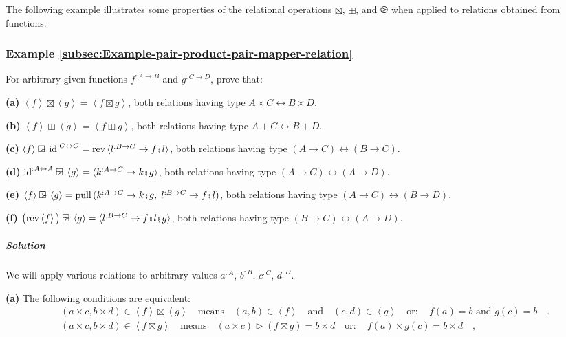 The following example illustrates some properties of the relational
operations $\boxtimes$, $\boxplus$, and $\ogreaterthan$ when applied
to relations obtained from functions.

\subsubsection{Example \label{subsec:Example-pair-product-pair-mapper-relation}\ref{subsec:Example-pair-product-pair-mapper-relation}}

For arbitrary given functions $f^{:A\rightarrow B}$ and $g^{:C\rightarrow D}$,
prove that:

\textbf{(a)} $\left<f\right>\boxtimes\left<g\right>=\left<f\boxtimes g\right>$,
both relations having type $A\times C\leftrightarrow B\times D$.

\textbf{(b)} $\left<f\right>\boxplus\left<g\right>=\left<f\boxplus g\right>$,
both relations having type $A+C\leftrightarrow B+D$.

\textbf{(c)} $\left<f\right>\ogreaterthan\text{id}^{:C\leftrightarrow C}=\text{rev}\,\langle l^{:B\rightarrow C}\rightarrow f\bef l\rangle$,
both relations having type $\left(A\rightarrow C\right)\leftrightarrow\left(B\rightarrow C\right)$.

\textbf{(d)} $\text{id}^{:A\leftrightarrow A}\ogreaterthan\left<g\right>=\langle k^{:A\rightarrow C}\rightarrow k\bef g\rangle$,
both relations having type $\left(A\rightarrow C\right)\leftrightarrow\left(A\rightarrow D\right)$.

\textbf{(e)} $\left<f\right>\ogreaterthan\left<g\right>=\text{pull}\,(k^{:A\rightarrow C}\rightarrow k\bef g,\;l^{:B\rightarrow C}\rightarrow f\bef l)$,
both relations having type $\left(A\rightarrow C\right)\leftrightarrow\left(B\rightarrow D\right)$.

\textbf{(f)} $\big(\text{rev}\left<f\right>\big)\ogreaterthan\left<g\right>=\langle l^{:B\rightarrow C}\rightarrow f\bef l\bef g\rangle$,
both relations having type $\left(B\rightarrow C\right)\leftrightarrow\left(A\rightarrow D\right)$.

\subparagraph{Solution}

We will apply various relations to arbitrary values $a^{:A}$, $b^{:B}$,
$c^{:C}$, $d^{:D}$.

\textbf{(a)} The following conditions are equivalent:
\begin{align*}
 & (a\times c,b\times d)\in\left<f\right>\boxtimes\left<g\right>\quad\text{means}\quad(a,b)\in\left<f\right>\quad\text{and}\quad(c,d)\in\left<g\right>\quad\text{or}:\quad f(a)=b\text{ and }g(c)=b\quad.\\
 & (a\times c,b\times d)\in\left<f\boxtimes g\right>\quad\text{means}\quad(a\times c)\triangleright(f\boxtimes g)=b\times d\quad\text{or}:\quad f(a)\times g(c)=b\times d\quad,
\end{align*}

